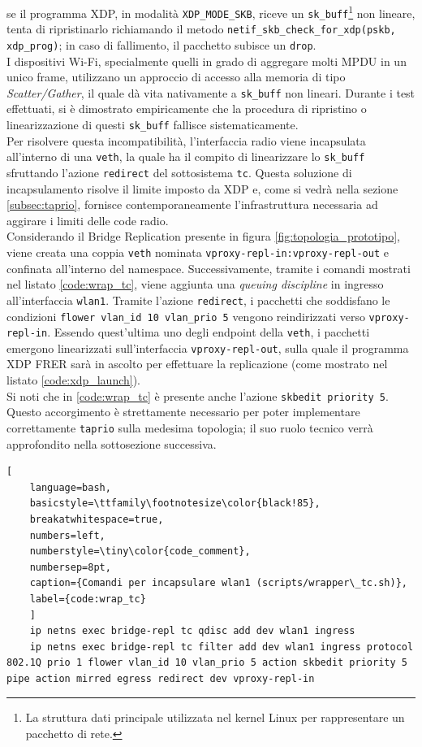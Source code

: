 \documentclass[12pt,a4paper,twoside]{book}
\begin{document}
\begin{onehalfspace}
se il programma XDP, in modalità \texttt{XDP\_MODE\_SKB}, riceve un \texttt{sk\_buff}\footnote{La struttura dati principale utilizzata nel kernel Linux per rappresentare un pacchetto di rete.} non lineare, tenta di ripristinarlo richiamando il metodo \texttt{netif\_skb\_check\_for\_xdp(pskb, xdp\_prog)}; in caso di fallimento, il pacchetto subisce un \texttt{drop}.
\\
I dispositivi Wi-Fi, specialmente quelli in grado di aggregare molti MPDU in un unico frame, utilizzano un approccio di accesso alla memoria di tipo \textit{Scatter/Gather}, il quale dà vita nativamente a \texttt{sk\_buff} non lineari. Durante i test effettuati, si è dimostrato empiricamente che la procedura di ripristino o linearizzazione di questi \texttt{sk\_buff} fallisce sistematicamente.
\\
Per risolvere questa incompatibilità, l'interfaccia radio viene incapsulata all'interno di una \texttt{veth}, la quale ha il compito di linearizzare lo \texttt{sk\_buff} sfruttando l'azione \texttt{redirect} del sottosistema \texttt{tc}. Questa soluzione di incapsulamento risolve il limite imposto da XDP e, come si vedrà nella sezione \ref{subsec:taprio}, fornisce contemporaneamente l'infrastruttura necessaria ad aggirare i limiti delle code radio.
\\
Considerando il Bridge Replication presente in figura \ref{fig:topologia_prototipo}, viene creata una coppia \texttt{veth} nominata \texttt{vproxy-repl-in:vproxy-repl-out} e confinata all'interno del namespace. Successivamente, tramite i comandi mostrati nel listato \ref{code:wrap_tc}, viene aggiunta una \textit{queuing discipline} in ingresso all'interfaccia \texttt{wlan1}. Tramite l'azione \texttt{redirect}, i pacchetti che soddisfano le condizioni \texttt{flower vlan\_id 10 vlan\_prio 5} vengono reindirizzati verso \texttt{vproxy-repl-in}. Essendo quest'ultima uno degli endpoint della \texttt{veth}, i pacchetti emergono linearizzati sull'interfaccia \texttt{vproxy-repl-out}, sulla quale il programma XDP FRER sarà in ascolto per effettuare la replicazione (come mostrato nel listato \ref{code:xdp_launch}).
\\
Si noti che in \ref{code:wrap_tc} è presente anche l'azione \texttt{skbedit priority 5}. Questo accorgimento è strettamente necessario per poter implementare correttamente \texttt{taprio} sulla medesima topologia; il suo ruolo tecnico verrà approfondito nella sottosezione successiva.

\begin{lstlisting}[
    language=bash,
    basicstyle=\ttfamily\footnotesize\color{black!85},
    breakatwhitespace=true,
    numbers=left,
    numberstyle=\tiny\color{code_comment},
    numbersep=8pt,
    caption={Comandi per incapsulare wlan1 (scripts/wrapper\_tc.sh)},
    label={code:wrap_tc}
    ]
    ip netns exec bridge-repl tc qdisc add dev wlan1 ingress
    ip netns exec bridge-repl tc filter add dev wlan1 ingress protocol 802.1Q prio 1 flower vlan_id 10 vlan_prio 5 action skbedit priority 5 pipe action mirred egress redirect dev vproxy-repl-in
\end{lstlisting}


\end{onehalfspace}
\end{document}
